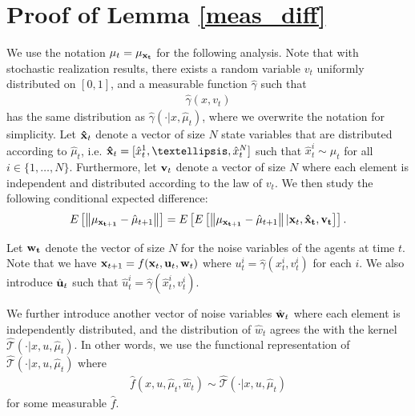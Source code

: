 \documentclass[twoside,11pt]{article}
\begin{document}
\section{Proof of Lemma \ref{meas_diff}}\label{meas_diff_proof}
 We use the notation $\mu_t= \mu_{\bf x_t}$ for the following analysis. Note that with stochastic realization results, there exists a random variable $v_t$ uniformly distributed on $[0,1]$, and a measurable function $\hat{\gamma}$ such that
\begin{align*}
\hat{\gamma}(x,v_t)
\end{align*}
has the same distribution as  $\hat{\gamma}(\cdot|x,\hat{\mu}_t)$, where we overwrite the notation for simplicity. Let ${\bf \hat{x}}_t$ denote a vector of size $N$ state variables that are distributed according to $\hat{\mu}_t$, i.e. ${\bf \hat{x}}_t= [\hat{x}^1_t,\dots,\hat{x}^N_t]$ such that $\hat{x}_t^i\sim \hat{\mu}_t$ for all $i\in\{1,\dots,N\}$. Furthermore, let ${\bf v}_t$ denote a vector of size $N$ where each element is independent and distributed according to the law of $v_t$. We then study the following conditional expected difference:
\begin{align*}
E\left[ \left\|\mu_{\bf x_{t+1}} - \hat{\mu}_{t+1}\right\|\right] = E \left[  E\left[\left\|\mu_{\bf x_{t+1}} - \hat{\mu}_{t+1}\right\|  |  {\bf x}_t,{\bf \hat{x}_t} , {\bf v_t}  \right]   \right].
\end{align*}

Let $\bf w_t$ denote the vector of size $N$ for the noise variables of the agents at time $t$.  Note that we have ${\bf x}_{t+1} = f({\bf x}_t,{\bf u}_t,{\bf w}_t)$ where $u^i_t = \hat{\gamma}(x^i_t,v^i_t)$ for each $i$.   We also introduce  $\hat{\bf u}_t$  such that $\hat{u}^i_t = \hat{\gamma}(\hat{x}^i_t,v_t^i)$.     

We further introduce another vector of noise variables $\hat{\bf w}_t$ where each element is independently distributed, and the distribution of $\hat{w}_t$ agrees the with the kernel $\hat{\mathcal{T}}(\cdot|x,u,\hat{\mu}_t)$. In other words, we use the functional representation of $\hat{\mathcal{T}}(\cdot|x,u,\hat{\mu}_t)$ where 
\begin{align*}
 \hat{f} (x,u,\hat{\mu}_t,\hat{w}_t) \sim \hat{\mathcal{T}}(\cdot|x,u,\hat{\mu}_t)
\end{align*}
for some measurable $\hat{f}$.
\end{document}
